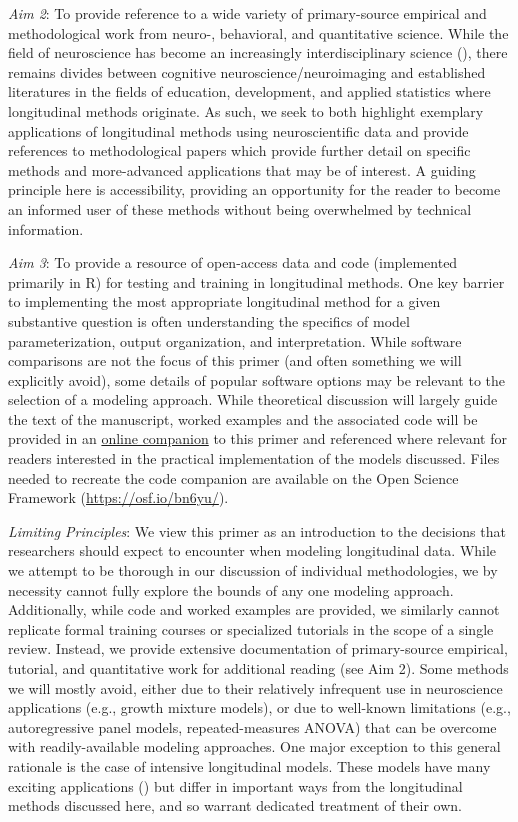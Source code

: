 \documentclass[11pt]{article}
\begin{document}
\textit{Aim 2}: To provide reference to a wide variety of primary-source empirical and methodological work from neuro-, behavioral, and quantitative science. While the field of neuroscience has become an increasingly interdisciplinary science (\cite{pfeifer_modeling_2018}), there remains divides between cognitive neuroscience/neuroimaging and established literatures in the fields of education, development, and applied statistics where longitudinal methods originate. As such, we seek to both highlight exemplary applications of longitudinal methods using neuroscientific data and provide references to methodological papers which provide further detail on specific methods and more-advanced applications that may be of interest. A guiding principle here is accessibility, providing an opportunity for the reader to become an informed user of these methods without being overwhelmed by technical information.

\textit{Aim 3}: To provide a resource of open-access data and code (implemented primarily in R) for testing and training in longitudinal methods. One key barrier to implementing the most appropriate longitudinal method for a given substantive question is often understanding the specifics of model parameterization, output organization, and interpretation. While software comparisons are not the focus of this primer (and often something we will explicitly avoid), some details of popular software options may be relevant to the selection of a modeling approach. While theoretical discussion will largely guide the text of the manuscript, worked examples and the associated code will be provided in an \href{https://e-m-mccormick.github.io/static/longitudinal-primer/index.html}{online companion} to this primer and referenced where relevant for readers interested in the practical implementation of the models discussed. Files needed to recreate the code companion are available on the Open Science Framework (\url{https://osf.io/bn6yu/}).

\textit{Limiting Principles}: We view this primer as an introduction to the decisions that researchers should expect to encounter when modeling longitudinal data. While we attempt to be thorough in our discussion of individual methodologies, we by necessity cannot fully explore the bounds of any one modeling approach. Additionally, while code and worked examples are provided, we similarly cannot replicate formal training courses or specialized tutorials in the scope of a single review. Instead, we provide extensive documentation of primary-source empirical, tutorial, and quantitative work for additional reading (see Aim 2). Some methods we will mostly avoid, either due to their relatively infrequent use in neuroscience applications (e.g., growth mixture models), or due to well-known limitations (e.g., autoregressive panel models, repeated-measures ANOVA) that can be overcome with readily-available modeling approaches. One major exception to this general rationale is the case of intensive longitudinal models. These models have many exciting applications (\cite{bolger_intensive_2013}) but differ in important ways from the longitudinal methods discussed here, and so warrant dedicated treatment of their own.
\end{document}
